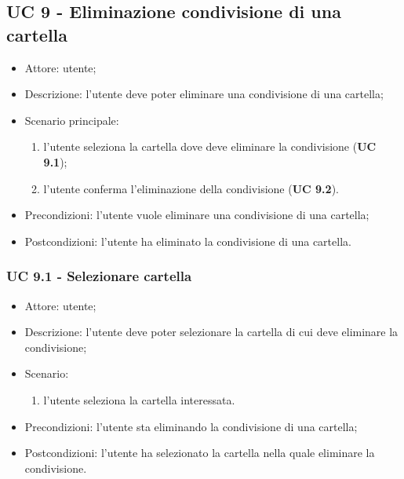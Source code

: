     \subsection{UC 9 - Eliminazione condivisione di una cartella}
    \begin{itemize}
        \item Attore: utente;
        \item Descrizione: l'utente deve poter eliminare una condivisione di una cartella;
        \item Scenario principale:
            \begin{enumerate}
            \item l'utente seleziona la cartella dove deve eliminare la condivisione (\textbf{UC 9.1});
            \item l'utente conferma l'eliminazione della condivisione (\textbf{UC 9.2}).
            \end{enumerate}
        \item Precondizioni: l'utente vuole eliminare una condivisione di una cartella;
        \item Postcondizioni: l'utente ha eliminato la condivisione di una cartella.
    \end{itemize}
    \subsubsection{UC 9.1 - Selezionare cartella}
    \begin{itemize}
        \item Attore: utente;
        \item Descrizione: l'utente deve poter selezionare la cartella di cui deve eliminare la condivisione;
        \item Scenario:
        \begin{enumerate}
        \item l'utente seleziona la cartella interessata.
        \end{enumerate}
        \item Precondizioni: l'utente sta eliminando la condivisione di una cartella;
        \item Postcondizioni: l'utente ha selezionato la cartella nella quale eliminare la condivisione.
    \end{itemize}

